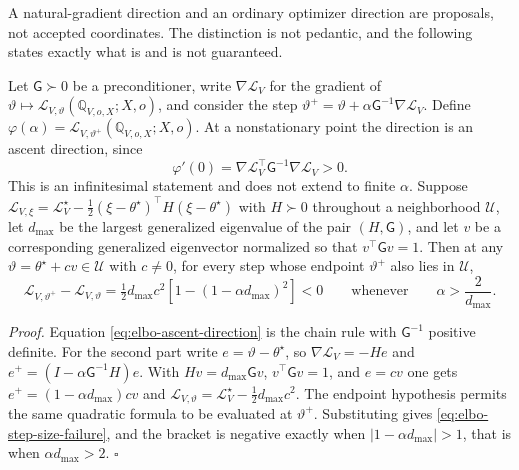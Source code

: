 A natural-gradient direction and an ordinary optimizer direction are proposals, not accepted coordinates. The distinction is not pedantic, and the following states exactly what is and is not guaranteed.

Let \(\mathsf G\succ0\) be a preconditioner, write \(\nabla\mathcal L_V\) for the gradient of \(\vartheta\mapsto\mathcal L_{V,\vartheta}(\mathbb Q_{V,o,X};X,o)\), and consider the step \(\vartheta^{+}=\vartheta+\alpha\mathsf G^{-1}\nabla\mathcal L_V\). Define \(\varphi(\alpha)=\mathcal L_{V,\vartheta^{+}}(\mathbb Q_{V,o,X};X,o)\). At a nonstationary point the direction is an ascent direction, since
\begin{equation}
\varphi'(0)=
\nabla\mathcal L_V^{\top}\mathsf G^{-1}\nabla\mathcal L_V>0.
\label{eq:elbo-ascent-direction}
\end{equation}
This is an infinitesimal statement and does not extend to finite \(\alpha\). Suppose \(\mathcal L_{V,\xi}=\mathcal L_V^{\star}-\tfrac12(\xi-\theta^{\star})^\top H(\xi-\theta^{\star})\) with \(H\succ0\) throughout a neighborhood \(\mathcal U\), let \(d_{\max}\) be the largest generalized eigenvalue of the pair \((H,\mathsf G)\), and let \(v\) be a corresponding generalized eigenvector normalized so that \(v^{\top}\mathsf Gv=1\). Then at any \(\vartheta=\theta^{\star}+cv\in\mathcal U\) with \(c\neq0\), for every step whose endpoint \(\vartheta^+\) also lies in \(\mathcal U\),
\begin{equation}
\mathcal L_{V,\vartheta^{+}}-\mathcal L_{V,\vartheta}
=\tfrac12d_{\max}c^{2}
\left[1-\left(1-\alpha d_{\max}\right)^{2}\right]<0
\qquad\text{whenever}\qquad
\alpha>\frac{2}{d_{\max}}.
\label{eq:elbo-step-size-failure}
\end{equation}

\emph{Proof.} Equation \eqref{eq:elbo-ascent-direction} is the chain rule with \(\mathsf G^{-1}\) positive definite. For the second part write \(e=\vartheta-\theta^{\star}\), so \(\nabla\mathcal L_V=-He\) and \(e^{+}=(I-\alpha\mathsf G^{-1}H)e\). With \(Hv=d_{\max}\mathsf Gv\), \(v^{\top}\mathsf Gv=1\), and \(e=cv\) one gets \(e^{+}=(1-\alpha d_{\max})cv\) and \(\mathcal L_{V,\vartheta}=\mathcal L_V^{\star}-\tfrac12d_{\max}c^{2}\). The endpoint hypothesis permits the same quadratic formula to be evaluated at \(\vartheta^+\). Substituting gives \eqref{eq:elbo-step-size-failure}, and the bracket is negative exactly when \(|1-\alpha d_{\max}|>1\), that is when \(\alpha d_{\max}>2\). \hfill\(\square\)

